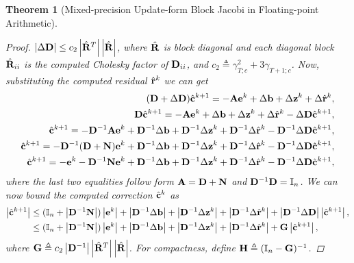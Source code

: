 \documentclass[11pt,draft]{article}
\newcommand{\define}{\ensuremath{\triangleq}}
\newcommand{\vect}[1]{\mathbf{\MakeLowercase{#1}}}
\newcommand{\mat}[1]{\mathbf{\MakeUppercase{#1}}}
\newtheorem{theorem}{Theorem}[section]
\theoremstyle{definition}
\theoremstyle{remark}
\newcommand{\abs}[1]{\left|#1\right|}
\begin{document}
\begin{theorem}[Mixed-precision Update-form Block Jacobi in Floating-point Arithmetic]
\begin{proof}
    $\abs{\Delta \mat{d}} \leq c_2
    \abs{\hat{\mat{r}}^T}\abs{\hat{\mat{r}}}$, where
    $\hat{\mat{r}}$ is block diagonal and each diagonal block
    $\hat{\mat{r}}_{ii}$ is the computed Cholesky factor of
    $\mat{d}_{ii}$, and $c_2\define \gamma_{T;c}^2 + 3\gamma_{T+1;c}$.
    Now, substituting the computed residual $\hat{\vect{r}}^k$ we can get
    \begin{align}
    (\mat{d} + \Delta \mat{d}) \hat{\vect{c}}^{k+1} = - \mat{a}\vect{e}^k + \Delta \vect{b} + \Delta \vect{z}^k + \Delta \hat{\vect{r}}^k,\\
    \mat{d}\hat{\vect{c}}^{k+1} = - \mat{a}\vect{e}^k + \Delta \vect{b} + \Delta \vect{z}^k + \Delta \hat{\vect{r}}^k - \Delta \mat{d} \hat{\vect{c}}^{k+1},\\
    \hat{\vect{c}}^{k+1} = - \mat{d}^{-1}\mat{a}\vect{e}^k + \mat{d}^{-1}\Delta \vect{b} + \mat{d}^{-1}\Delta \vect{z}^k + \mat{d}^{-1}\Delta \hat{\vect{r}}^k - \mat{d}^{-1}\Delta \mat{d} \hat{\vect{c}}^{k+1},\\
    \hat{\vect{c}}^{k+1} = - \mat{d}^{-1}(\mat{d} + \mat{n})\vect{e}^k + \mat{d}^{-1}\Delta \vect{b} + \mat{d}^{-1}\Delta \vect{z}^k + \mat{d}^{-1}\Delta \hat{\vect{r}}^k - \mat{d}^{-1}\Delta \mat{d} \hat{\vect{c}}^{k+1},\\
    \hat{\vect{c}}^{k+1} = - \vect{e}^k -\mat{d}^{-1}\mat{n}\vect{e}^k + \mat{d}^{-1}\Delta \vect{b} + \mat{d}^{-1}\Delta \vect{z}^k + \mat{d}^{-1}\Delta \hat{\vect{r}}^k - \mat{d}^{-1}\Delta \mat{d} \hat{\vect{c}}^{k+1},
    \end{align}
    where the last two equalities follow form $\mat{a}=\mat{d} + \mat{n}$ and $\mat{d}^{-1}\mat{d}=\mathbb{I}_n$.
    We can now bound the computed correction $\hat{\vect{c}}^k$ as
    \begin{align}
        \abs{\hat{\vect{c}}^{k+1}} &\leq (\mathbb{I}_n + \abs{\mat{d}^{-1}\mat{n}})\abs{\vect{e}^k} + \abs{\mat{d}^{-1}\Delta \vect{b}} + \abs{\mat{d}^{-1}\Delta \vect{z}^k} + \abs{\mat{d}^{-1}\Delta \hat{\vect{r}}^k} + \abs{\mat{d}^{-1}\Delta \mat{d}} \abs{\hat{\vect{c}}^{k+1}},\\
         &\leq (\mathbb{I}_n + \abs{\mat{d}^{-1}\mat{n}})\abs{\vect{e}^k} + \abs{\mat{d}^{-1}\Delta \vect{b}} + \abs{\mat{d}^{-1}\Delta \vect{z}^k} + \abs{\mat{d}^{-1}\Delta \hat{\vect{r}}^k} + \mat{g} \abs{\hat{\vect{c}}^{k+1}},
    \end{align}
    where $\mat{g}\define c_2\abs{\mat{d}^{-1}}\abs{\hat{\mat{r}}^T}\abs{\hat{\mat{r}}}$.
    For compactness, define $\mat{h}\define (\mathbb{I}_n - \mat{G})^{-1}$.

\end{proof}
\end{theorem}
\end{document}
